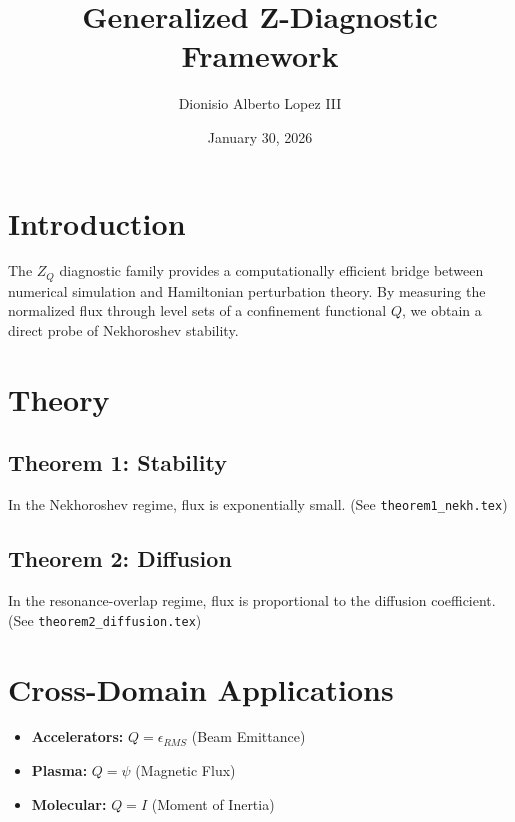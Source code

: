 \documentclass{article}
\title{Generalized Z-Diagnostic Framework}
\author{Dionisio Alberto Lopez III}
\date{January 30, 2026}
\begin{document}
\maketitle

\section{Introduction}
The $Z_Q$ diagnostic family provides a computationally efficient bridge between numerical simulation and Hamiltonian perturbation theory. By measuring the normalized flux through level sets of a confinement functional $Q$, we obtain a direct probe of Nekhoroshev stability.

\section{Theory}
\subsection{Theorem 1: Stability}
In the Nekhoroshev regime, flux is exponentially small. (See \texttt{theorem1\_nekh.tex})

\subsection{Theorem 2: Diffusion}
In the resonance-overlap regime, flux is proportional to the diffusion coefficient. (See \texttt{theorem2\_diffusion.tex})

\section{Cross-Domain Applications}
\begin{itemize}
    \item \textbf{Accelerators:} $Q = \epsilon_{RMS}$ (Beam Emittance)
    \item \textbf{Plasma:} $Q = \psi$ (Magnetic Flux)
    \item \textbf{Molecular:} $Q = I$ (Moment of Inertia)
\end{itemize}
\end{document}
